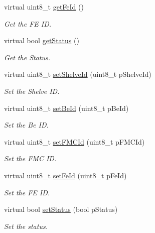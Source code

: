 \begin{DoxyCompactItemize}
virtual uint8\-\_\-t \hyperlink{class_ph2___hw_description_1_1_front_end_description_ad06faa4f2096e3324857a0c6d0b227b4}{get\-Fe\-Id} ()
\begin{DoxyCompactList}\small\item\em Get the F\-E I\-D. \end{DoxyCompactList}\item 
virtual bool \hyperlink{class_ph2___hw_description_1_1_front_end_description_ad5b25135c78f750c36673a8861395426}{get\-Status} ()
\begin{DoxyCompactList}\small\item\em Get the Status. \end{DoxyCompactList}\item 
virtual uint8\-\_\-t \hyperlink{class_ph2___hw_description_1_1_front_end_description_a97a696025936be0a15120568bfc2b7f4}{set\-Shelve\-Id} (uint8\-\_\-t p\-Shelve\-Id)
\begin{DoxyCompactList}\small\item\em Set the Shelve I\-D. \end{DoxyCompactList}\item 
virtual uint8\-\_\-t \hyperlink{class_ph2___hw_description_1_1_front_end_description_a25f69174ff9235506ba724a9d3a73258}{set\-Be\-Id} (uint8\-\_\-t p\-Be\-Id)
\begin{DoxyCompactList}\small\item\em Set the Be I\-D. \end{DoxyCompactList}\item 
virtual uint8\-\_\-t \hyperlink{class_ph2___hw_description_1_1_front_end_description_a55bea01460c40941b418f8cf45b50866}{set\-F\-M\-C\-Id} (uint8\-\_\-t p\-F\-M\-C\-Id)
\begin{DoxyCompactList}\small\item\em Set the F\-M\-C I\-D. \end{DoxyCompactList}\item 
virtual uint8\-\_\-t \hyperlink{class_ph2___hw_description_1_1_front_end_description_aef118ad340a54c824da417c9f36816d7}{set\-Fe\-Id} (uint8\-\_\-t p\-Fe\-Id)
\begin{DoxyCompactList}\small\item\em Set the F\-E I\-D. \end{DoxyCompactList}\item 
virtual bool \hyperlink{class_ph2___hw_description_1_1_front_end_description_a52c109ef30172eef0e74bf6a2370ca71}{set\-Status} (bool p\-Status)
\begin{DoxyCompactList}\small\item\em Set the status. \end{DoxyCompactList}\end{DoxyCompactItemize}

